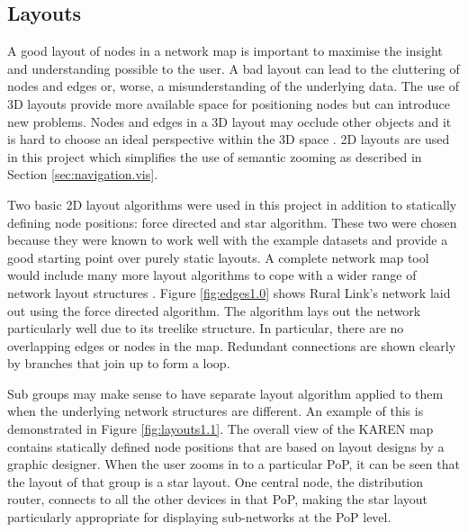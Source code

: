 \documentclass[11pt, a4paper]{article}
\begin{document}
\subsection{Layouts}
\label{sec:layouts.vis}

% 

% 

A good layout of nodes in a network map is important to maximise the insight and
understanding possible to the user. A bad layout can lead to the cluttering of
nodes and edges or, worse, a misunderstanding of the underlying data. The use of
3D layouts provide more available space for positioning nodes but can introduce
new problems. Nodes and edges in a 3D layout may occlude other objects and it is
hard to choose an ideal perspective within the 3D space \cite{Lai_1998}. 2D
layouts are used in this project which simplifies the use of semantic zooming as
described in Section \ref{sec:navigation.vis}. 

Two basic 2D layout algorithms were used in this project in addition to
statically defining node positions: force directed and star algorithm. These
two were chosen because they were known to work well with the example datasets
and provide a good starting point over purely static layouts. A complete network
map tool would include many more layout algorithms to cope with a wider range of
network layout structures \cite{Paul_2000}. Figure \ref{fig:edges1.0} shows
Rural Link's network laid out using the force directed algorithm. The algorithm
lays out the network particularly well due to its treelike structure. In
particular, there are no overlapping edges or nodes in the map. Redundant
connections are shown clearly by branches that join up to form a loop. 

Sub groups may make sense to have separate layout algorithm applied to them when
the underlying network structures are different. An example of this is
demonstrated in Figure \ref{fig:layouts1.1}. The overall view of the KAREN map
contains statically defined node positions that are based on layout designs by a
graphic designer. When the user zooms in to a particular PoP, it can be seen
that the layout of that group is a star layout. One central node, the
distribution router, connects to all the other devices in that PoP, making the
star layout particularly appropriate for displaying sub-networks at the PoP
level.
\end{document}

